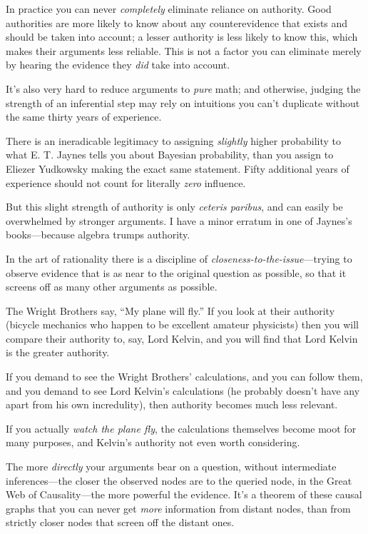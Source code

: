 {
 In practice you can never \textit{completely} eliminate reliance
on authority. Good authorities are more likely to know about any
counterevidence that exists and should be taken into account; a lesser
authority is less likely to know this, which makes their arguments less
reliable. This is not a factor you can eliminate merely by hearing the
evidence they \textit{did} take into account.}

{
 It's also very hard to reduce arguments to
\textit{pure} math; and otherwise, judging the strength of an
inferential step may rely on intuitions you can't
duplicate without the same thirty years of experience.}

{
 There is an ineradicable legitimacy to assigning \textit{slightly}
higher probability to what E. T. Jaynes tells you about Bayesian
probability, than you assign to Eliezer Yudkowsky making the exact same
statement. Fifty additional years of experience should not count for
literally \textit{zero} influence.}

{
 But this slight strength of authority is only \textit{ceteris
paribus}, and can easily be overwhelmed by stronger arguments. I have a
minor erratum in one of Jaynes's books---because
algebra trumps authority.}

\myendsectiontext


\bigskip


{
 In the art of rationality there is a discipline of
\textit{closeness-to-the-issue}{}---trying to observe evidence that is
as near to the original question as possible, so that it screens off as
many other arguments as possible. }

{
 The Wright Brothers say, ``My plane will
fly.'' If you look at their authority (bicycle
mechanics who happen to be excellent amateur physicists) then you will
compare their authority to, say, Lord Kelvin, and you will find that
Lord Kelvin is the greater authority.}

{
 If you demand to see the Wright Brothers'
calculations, and you can follow them, and you demand to see Lord
Kelvin's calculations (he probably
doesn't have any apart from his own incredulity), then
authority becomes much less relevant.}

{
 If you actually \textit{watch the plane fly}, the calculations
themselves become moot for many purposes, and Kelvin's
authority not even worth considering.}

{
 The more \textit{directly} your arguments bear on a question,
without intermediate inferences---the closer the observed nodes are to
the queried node, in the Great Web of Causality---the more powerful the
evidence. It's a theorem of these causal graphs that
you can never get \textit{more} information from distant nodes, than
from strictly closer nodes that screen off the distant ones.}

